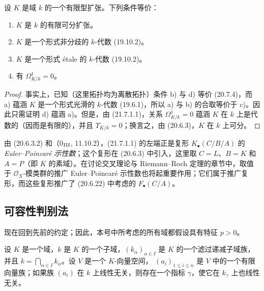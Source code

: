 \begin{corollary}[21.7.4]
\label{0.21.7.4-fr}
设 $K$ 是域 $k$ 的一个有限型扩张。下列条件等价：
\begin{enumerate}
  \item[\rm a)] $K$ 是 $k$ 的有限可分扩张。
  \item[\rm b)] $K$ 是一个形式非分歧的 $k$-代数 (19.10.2)。
  \item[\rm c)] $K$ 是一个形式 étale 的 $k$-代数 (19.10.2)。
  \item[\rm d)] 有 $\Omega^1_{K/k}=0$。
\end{enumerate}
\end{corollary}

\begin{proof}
事实上，已知（这里拓扑均为离散拓扑）条件 b) 与 d) 等价 (20.7.4)，而 a)
蕴涵 $K$ 是一个形式光滑的 $k$-代数 (19.6.1)，所以 a) 与 b) 的合取等价于
c)。因此只需证明 d) 蕴涵 a)。但是，由 (21.7.1.1)，关系
$\Omega^1_{K/k}=0$ 蕴涵 $K$ 在 $k$ 上是代数的（因而是有限的），并且
$\Upsilon_{K/k}=0$；换言之，由 (20.6.3)，$K$ 在 $k$ 上可分。
\end{proof}

\begin{remark}[21.7.5]
\label{0.21.7.5-fr}
由 (20.6.3.2) 和（0$_{\rm III}$, 11.10.2），(21.7.1.1) 的左端正是复形
$K_\bullet(C/B/A)$ 的 \emph{Euler--Poincaré 示性数}；这个复形在 (20.6.3)
中引入，这里取 $C=L$、$B=K$ 和 $A=P$（即 $K$ 的素域）。在讨论交叉理论与
Riemann--Roch 定理的章节中，取值于 $\mathcal O_X$-模类群的推广
Euler--Poincaré 示性数也将起重要作用；它们属于推广复形，而这些复形推广了
(20.6.22) 中考虑的 $F_\bullet(C/A)$。
\end{remark}

\subsection{可容性判别法}
\label{subsection:0.21.8-fr}

现在回到先前的约定；因此，本号中所考虑的所有域都假设具有特征 $p>0$。

\begin{lemma}[21.8.1]
\label{0.21.8.1-fr}
设 $K$ 是一个域，$k$ 是 $K$ 的一个子域，$(k_\alpha)_{\alpha\in I}$ 是
$K$ 的一个滤过递减子域族，并且
$k=\bigcap_{\alpha\in I}k_\alpha$。设 $V$ 是一个 $K$-向量空间，
$(a_i)_{1\leqslant i\leqslant n}$ 是 $V$ 中的一个有限向量族；如果族
$(a_i)$ 在 $k$ 上线性无关，则存在一个指标 $\gamma$，使它在 $k_\gamma$
上也线性无关。
\end{lemma}

